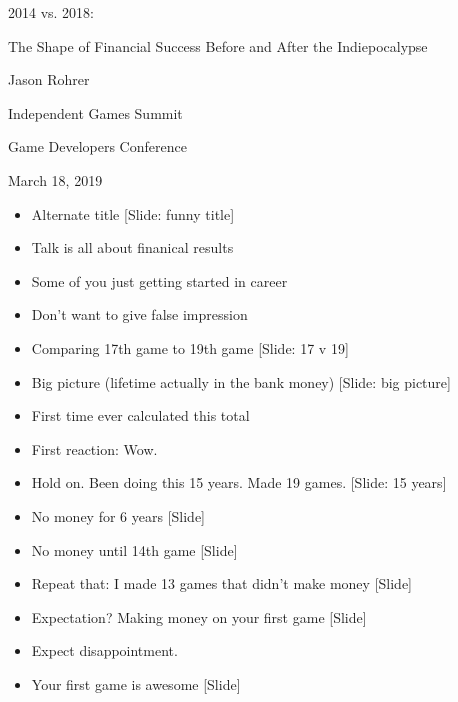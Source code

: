 \documentclass[12pt]{article}
\begin{document}
\begin{center}
2014 vs. 2018:

The Shape of Financial Success Before and After the Indiepocalypse

Jason Rohrer

Independent Games Summit

Game Developers Conference 

March 18, 2019
\end{center}


{\Huge



\begin{itemize}

\item Alternate title [Slide: funny title]

\item Talk is all about finanical results

\item Some of you just getting started in career

\item Don't want to give false impression

\item Comparing 17th game to 19th game [Slide:  17 v 19]

\item Big picture (lifetime actually in the bank money) [Slide: big picture]

\item First time ever calculated this total

\item First reaction:  Wow.

\item Hold on.  Been doing this 15 years.  Made 19 games.  [Slide: 15 years]

\item No money for 6 years [Slide]

\item No money until 14th game [Slide]

\item Repeat that:  I made 13 games that didn't make money [Slide]

\item Expectation?  Making money on your first game [Slide]

\item Expect disappointment.

\item Your first game is awesome [Slide]


\end{itemize}}
\end{document}
